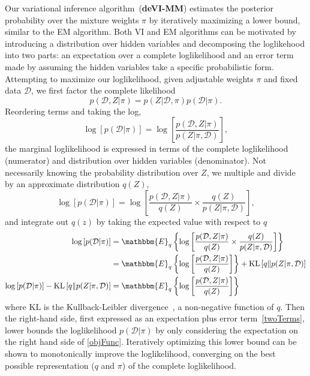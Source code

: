 \documentclass[12pt]{article}
\def\l{\left}
\def\r{\right}
\newcommand{\f}{\frac}
\begin{document}
Our variational inference algorithm~(\textbf{deVI-MM}) estimates the posterior probability over the mixture weights $\pi$ by iteratively maximizing a lower bound, similar to the EM algorithm.
Both VI and EM algorithms can be motivated by introducing a distribution over hidden variables and decomposing the loglikehood into two parts: an expectation over a complete loglikelihood and an error term made by assuming the hidden variables take a specific probabilistic form. 
Attempting to maximize our loglikelihood, given adjustable weights $\pi$ and fixed data $\mathcal{D}$, we first factor the complete likelihood
\begin{equation*}
  p(\mathcal{D},Z | \pi) = p(Z|\mathcal{D},\pi) p(\mathcal{D}|\pi).
\end{equation*}
Reordering terms and taking the log,
\begin{equation*}
  \log \l[ p(\mathcal{D} | \pi) \r] = \log \l[  \f{p(\mathcal{D}, Z | \pi)}{p(Z| \pi, \mathcal{D})}\r] \nonumber,
\end{equation*}
the marginal loglikelihood is expressed in terms of the complete loglikelihood (numerator) and distribution over hidden variables (denominator). 
Not necessarily knowing the probability distribution over $Z$, we multiple and divide by an approximate distribution $q(Z)$,
\begin{equation}
  \log \l[ p(\mathcal{D} | \pi) \r] = \log \l[  \f{p(\mathcal{D}, Z | \pi)}{q(Z)} \times \f{q(Z)}{p(Z| \pi, \mathcal{D})}\r], \nonumber
\end{equation}
and integrate out $q(z)$ by taking the expected value with respect to $q$
\begin{align}
  \log \l[ p(\mathcal{D} | \pi) \r] &= \mathbbm{E}_{q} \l\{\log \l[  \f{p(\mathcal{D}, Z | \pi)}{q(Z)} \times \f{q(Z)}{p(Z| \pi, \mathcal{D})}\r]\r\} \nonumber \\
   &= \mathbbm{E}_{q} \l\{ \log \l[  \f{p(\mathcal{D}, Z | \pi)}{q(Z)} \r] \r\} + \mathrm{KL} \l[q \| p(Z| \pi, \mathcal{D}) \r] \label{twoTerms}\\
  \log \l[ p(\mathcal{D} | \pi) \r] - \mathrm{KL} \l[q \| p(Z| \pi, \mathcal{D}) \r]  &= \mathbbm{E}_{q} \l\{ \log \l[  \f{p(\mathcal{D}, Z | \pi)}{q(Z)} \r] \r\} \label{objFunc}
\end{align}
where $\mathrm{KL}$ is the Kullback-Leibler divergence~\cite{cover2012elements}, a non-negative function of $q$.
Then the right-hand side, first expressed as an expectation plus error term~\eqref{twoTerms}, lower bounds the loglikelihood $p(\mathcal{D}|\pi)$ by only considering the expectation on the right hand side of \eqref{objFunc}. Iteratively optimizing this lower bound can be shown to monotonically improve the loglikelihood, converging on the best possible representation ($q$ and $\pi$) of the complete loglikelihood. 
\end{document}
